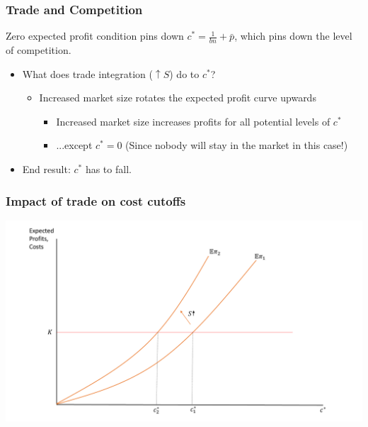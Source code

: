 \documentclass{beamer}
\begin{document}
\begin{frame}[label=cost2]
	\frametitle{Trade and Competition}
Zero expected profit condition pins down $c^*=\frac{1}{bn}+\bar{p}$, which pins down the level of competition.
	\begin{itemize}
		\item What does trade integration ($\uparrow S$) do to $c^*$?
			\begin{itemize}
				\item Increased market size rotates the expected profit curve upwards \hyperlink{Formal2}{}
					\begin{itemize}
						\item Increased market size increases profits for all potential levels of $c^*$ 
						\item ...except $c^*=0$ (Since nobody will stay in the market in this case!)
					\end{itemize}
			\end{itemize}
		\item End result: $c^*$ has to fall.
	\end{itemize}
\end{frame}

\begin{frame}
	\frametitle{Impact of trade on cost cutoffs}
			\includegraphics[scale=0.32]{SL3_6.pdf}
\end{frame}
\end{document}
